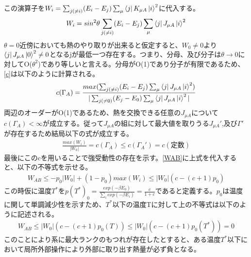 \documentclass[a4paper,10.5pt]{article}
\numberwithin{equation}{section}
\begin{document}
この演算子を$W_{i}=\sum_{j(\neq i)}(E_{i}-E_{j})\sum_{\mu}\bra{j}K_{\mu A}\ket{i}^{2}$に代入する。
\begin{equation}\begin{split}
    W_{i}=sin^{2}\theta \sum_{j(\neq i)}(E_{i}-E_{j})\sum_{\mu}\bra{j}J_{\mu A}\ket{i}^{2}
\end{split} \end{equation}
$\theta=0$近傍においても熱のやり取りが出来ると仮定すると、$W_{0}\neq 0$より$\bra{j}J_{\mu A}\ket{0}^{2}\neq 0$となるjが最低一つ存在する。つまり、分母、及び分子は$\theta \to 0$に対してO($\theta^{2}$)であり等しいと言える。分母がO(1)であり分子が有限であるため、\eqref{c}は以下のように計算される。
\begin{equation}\begin{split}
    c(\Gamma_{A})=\frac{max(\sum_{j(\neq i)}(E_{i}-E_{j})\sum_{\mu}\bra{j}J_{\mu A}\ket{i}^{2})}{|\sum_{j(\neq 0)}(E_{j}-E_{0})\sum_{\mu}\bra{j}J_{\mu A}\ket{i}^{2}|}
\end{split} \end{equation}
両辺のオーダーがO(1)であるため、熱を交換できる任意の$J_{\mu A}$について$c(\Gamma_{A}) < \infty $が成立する。従って$J_{\mu A}$の組に対して最大値を取りうる$J_{\mu A}'$,及び$\Gamma'$が存在するため結局以下の式が成立する。
\begin{equation}\begin{split}
    \frac{max(W_{i})}{|W_{0}|}=c(\Gamma_{A}) \leq c(\Gamma_{A}') =c(\text{定数})
\end{split} \end{equation}
最後にこのcを用いることで強受動性の存在を示す。\eqref{WAB}に上式を代入すると、以下の不等式を示せる。
\begin{equation}\begin{split}
    W_{AB} \leq -p_{0}|W_{0}| +(1-p_{0})max(W_{i}) \leq |W_{0}|(c-(c+1)p_{0})
\end{split} \end{equation}
この時仮に温度$T^{*}$を$p(T^{*})_{0}=\frac{exp(-\beta E_{0})}{\sum_{i}exp(-\beta E_{i})}=\frac{c}{1+c}$であると定義する。$p_{0}$は温度に関して単調減少性を示すため、$T^{*}$以下の温度Tに対して上の不等式は以下のように記述される。
\begin{equation}\begin{split}
    W_{AB}\leq |W_{0}|(c-(c+1)p_{0}(T))\leq |W_{0}|(c-(c+1)p_{0}(T^{*})) =0
\end{split} \end{equation}
このことにより系に最大ランクのもつれが存在したとすると、ある温度$T^{*}$以下において局所外部操作により外部に取り出す熱量が必ず負となる。\\
\end{document}
